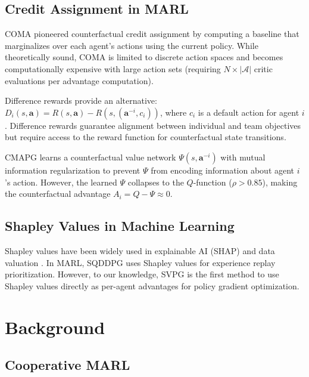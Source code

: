 \documentclass[11pt,a4paper]{article}
\begin{document}
\subsection{Credit Assignment in MARL}

COMA \cite{foerster2018counterfactual} pioneered counterfactual credit assignment by computing a baseline that marginalizes over each agent's actions using the current policy. While theoretically sound, COMA is limited to discrete action spaces and becomes computationally expensive with large action sets (requiring $N \times |\mathcal{A}|$ critic evaluations per advantage computation).

Difference rewards \cite{agogino2004difference, propert2000difference} provide an alternative: $D_i(s,\mathbf{a}) = R(s,\mathbf{a}) - R(s, (\mathbf{a}^{-i}, c_i))$, where $c_i$ is a default action for agent $i$. Difference rewards guarantee alignment between individual and team objectives but require access to the reward function for counterfactual state transitions.

CMAPG \citep{cmapg2024} learns a counterfactual value network $\Psi(s, \mathbf{a}^{-i})$ with mutual information regularization to prevent $\Psi$ from encoding information about agent $i$'s action. However, the learned $\Psi$ collapses to the $Q$-function ($\rho > 0.85$), making the counterfactual advantage $A_i = Q - \Psi \approx 0$.

\subsection{Shapley Values in Machine Learning}

Shapley values \cite{shapley1953value} have been widely used in explainable AI (SHAP) \cite{lundberg2017shap} and data valuation \cite{ghorbani2019data}. In MARL, SQDDPG \cite{wang2020shapley} uses Shapley values for experience replay prioritization. However, to our knowledge, SVPG is the first method to use Shapley values directly as per-agent advantages for policy gradient optimization.

\section{Background}

\subsection{Cooperative MARL}
\end{document}

